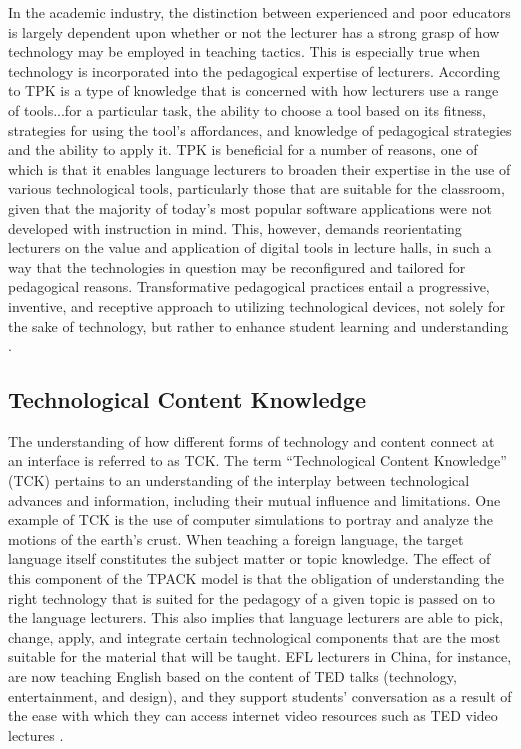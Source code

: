 \documentclass[english]{textolivre}
\begin{document}
In the academic industry, the distinction between experienced and poor educators is largely dependent upon whether or not the lecturer has a strong grasp of how technology may be employed in teaching tactics. This is especially true when technology is incorporated into the pedagogical expertise of lecturers. According to \textcite{koehler_what_2009} TPK is a type of knowledge that is concerned with how lecturers use a range of tools...for a particular task, the ability to choose a tool based on its fitness, strategies for using the tool’s affordances, and knowledge of pedagogical strategies and the ability to apply it. TPK is beneficial for a number of reasons, one of which is that it enables language lecturers to broaden their expertise in the use of various technological tools, particularly those that are suitable for the classroom, given that the majority of today’s most popular software applications were not developed with instruction in mind. This, however, demands reorientating lecturers on the value and application of digital tools in lecture halls, in such a way that the technologies in question may be reconfigured and tailored for pedagogical reasons. Transformative pedagogical practices entail a progressive, inventive, and receptive approach to utilizing technological devices, not solely for the sake of technology, but rather to enhance student learning and understanding \cite{hartono_language:_2021}.

\subsection{Technological Content Knowledge}

The understanding of how different forms of technology and content connect at an interface is referred to as TCK. The term “Technological Content Knowledge” (TCK) pertains to an understanding of the interplay between technological advances and information, including their mutual influence and limitations. One example of TCK is the use of computer simulations to portray and analyze the motions of the earth’s crust. When teaching a foreign language, the target language itself constitutes the subject matter or topic knowledge. The effect of this component of the TPACK model is that the obligation of understanding the right technology that is suited for the pedagogy of a given topic is passed on to the language lecturers. This also implies that language lecturers are able to pick, change, apply, and integrate certain technological components that are the most suitable for the material that will be taught. EFL lecturers in China, for instance, are now teaching English based on the content of TED talks (technology, entertainment, and design), and they support students’ conversation as a result of the ease with which they can access internet video resources such as TED video lectures \cite{andriany2022analysis}.
\end{document}
